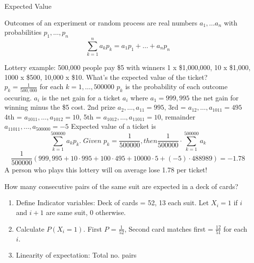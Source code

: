 \newcommand{\Exp}{\mathbb{E}}
\newcommand{\Nat}{\mathbb{N}}

\begin{definition}
    Expected Value
\end{definition}
Outcomes of an experiment or random process are real numbers $a_1, \dots a_n$ with probabilities $p_1, \dots, p_n$
\[ 
    \sum_{k=1}^{n} a_kp_k = a_1p_1 + \dots + a_np_n
\]

\begin{example}
Lottery example: 500,000 people pay \$5 with winners 1 x \$1,000,000, 10 x \$1,000, 1000 x \$500, 10,000 x \$10. What's the expected value of the ticket? \\
$p_k = \frac{1}{500,000}$ for each $k = 1, \dots, 500000$ $p_k$ is the probability of each outcome occuring. $a_i$ is the net gain for a ticket $a_i$ where $a_1 = 999,995$ the net gain for winning minus the \$5 cost. 
2nd prize $a_2, \dots, a_{11} = 995$, 3rd = $a_{12}, \dots, a_{1011} = 495$ 4th = $a_{1011}, \dots, a_{1012} = 10$, 5th = $a_{1012}, \dots, a_{11011} = 10$, remainder $a_{11011}, \dots, a_{500000} = -5$
Expected value of a ticket is 
\[
    \sum_{k=1}^{500000} a_kp_k. \; Given \; p_k = \frac{1}{500000}, then \frac{1}{500000} \cdot \sum_{k=1}^{500000} a_k
\]
\[
    \frac{1}{500000}(999,995 + 10 \cdot 995 + 100 \cdot 495 + 10000 \cdot 5 + (-5) \cdot 488989) = -1.78
\]
A person who plays this lottery will on average lose 1.78 per ticket!
\end{example}


\begin{example}
    How many consecutive pairs of the same suit are expected in a deck of cards?
    \begin{enumerate}
        \item Define Indicator variables: Deck of cards = 52, 13 each suit. Let $X_i = 1$ if $i$ and $i+1$ are same suit, 0 otherwise.
        \item Calculate $P(X_i = 1)$. First $P$ = $\frac{1}{52}$, Second card matches first = $\frac{12}{51}$ for each $i$.
        \item Linearity of expectation: Total no. pairs
    \end{enumerate}

\end{example}

















